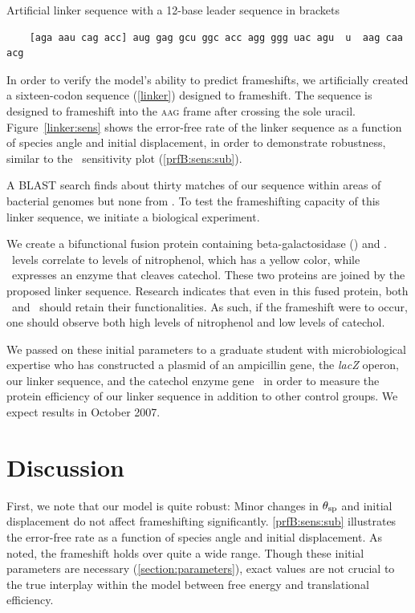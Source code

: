 \documentclass[12pt, draft]{article}
\numberwithin{equation}{section}
\begin{document}
\begin{cfigure}
  \caption{Artificial linker sequence with a 12-base leader sequence
    in brackets}
  \label{linker}
  \begin{verbatim}
    [aga aau cag acc] aug gag gcu ggc acc agg ggg uac agu  u  aag caa acg
  \end{verbatim}
\end{cfigure}

In order to verify the model's ability to predict frameshifts, we
artificially created a sixteen-codon sequence (\autoref{linker})
designed to frameshift.  The sequence is designed to frameshift into
the \textsc{aag} frame after crossing the sole uracil.  Figure~\ref{linker:sens}
shows the error-free rate of the linker sequence as a function of species
angle and initial displacement, in order to demonstrate robustness,
similar to the \prfB\ sensitivity plot (\autoref{prfB:sens:sub}).

A BLAST search finds about thirty matches of our sequence within areas of
bacterial genomes but none from \ecoli. To test the frameshifting capacity of
this linker sequence, we initiate a biological experiment.

We create a bifunctional fusion protein containing beta-galactosidase (\bgals) 
and \xylE. \bgals\ levels correlate to
levels of nitrophenol, which has a yellow color, while \xylE\ expresses
an enzyme that cleaves catechol.  These two proteins are joined by
the proposed linker sequence.  Research indicates that even in this
fused protein, both \bgals\ and \xylE\ should retain their functionalities.
As such, if the frameshift were to occur, one should observe both 
high levels of nitrophenol and low levels of catechol.

We passed on these initial parameters to a graduate student with
microbiological expertise who has constructed a plasmid of an
ampicillin gene, the \emph{lacZ} operon, our linker sequence, and the
catechol enzyme gene \xylE\ in order to measure the protein
efficiency of our linker sequence in addition to other control
groups. We expect results in October 2007.

\section{Discussion}
First, we note that our model is quite robust: Minor changes
in $\theta_{\rm{sp}}$ and initial displacement do not affect
frameshifting significantly.
\autoref{prfB:sens:sub} illustrates the error-free rate as
a function of species angle and initial displacement. As noted,
the frameshift holds over quite a wide range. Though these initial
parameters are necessary (\autoref{section:parameters}), exact values
are not
crucial to the true interplay within the model between free energy and
translational efficiency.
\end{document}
